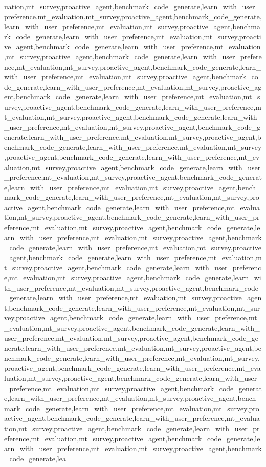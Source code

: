 uation,mt_survey,proactive_agent,benchmark_code_generate,learn_with_user_preference,mt_evaluation,mt_survey,proactive_agent,benchmark_code_generate,learn_with_user_preference,mt_evaluation,mt_survey,proactive_agent,benchmark_code_generate,learn_with_user_preference,mt_evaluation,mt_survey,proactive_agent,benchmark_code_generate,learn_with_user_preference,mt_evaluation,mt_survey,proactive_agent,benchmark_code_generate,learn_with_user_preference,mt_evaluation,mt_survey,proactive_agent,benchmark_code_generate,learn_with_user_preference,mt_evaluation,mt_survey,proactive_agent,benchmark_code_generate,learn_with_user_preference,mt_evaluation,mt_survey,proactive_agent,benchmark_code_generate,learn_with_user_preference,mt_evaluation,mt_survey,proactive_agent,benchmark_code_generate,learn_with_user_preference,mt_evaluation,mt_survey,proactive_agent,benchmark_code_generate,learn_with_user_preference,mt_evaluation,mt_survey,proactive_agent,benchmark_code_generate,learn_with_user_preference,mt_evaluation,mt_survey,proactive_agent,benchmark_code_generate,learn_with_user_preference,mt_evaluation,mt_survey,proactive_agent,benchmark_code_generate,learn_with_user_preference,mt_evaluation,mt_survey,proactive_agent,benchmark_code_generate,learn_with_user_preference,mt_evaluation,mt_survey,proactive_agent,benchmark_code_generate,learn_with_user_preference,mt_evaluation,mt_survey,proactive_agent,benchmark_code_generate,learn_with_user_preference,mt_evaluation,mt_survey,proactive_agent,benchmark_code_generate,learn_with_user_preference,mt_evaluation,mt_survey,proactive_agent,benchmark_code_generate,learn_with_user_preference,mt_evaluation,mt_survey,proactive_agent,benchmark_code_generate,learn_with_user_preference,mt_evaluation,mt_survey,proactive_agent,benchmark_code_generate,learn_with_user_preference,mt_evaluation,mt_survey,proactive_agent,benchmark_code_generate,learn_with_user_preference,mt_evaluation,mt_survey,proactive_agent,benchmark_code_generate,learn_with_user_preference,mt_evaluation,mt_survey,proactive_agent,benchmark_code_generate,learn_with_user_preference,mt_evaluation,mt_survey,proactive_agent,benchmark_code_generate,learn_with_user_preference,mt_evaluation,mt_survey,proactive_agent,benchmark_code_generate,learn_with_user_preference,mt_evaluation,mt_survey,proactive_agent,benchmark_code_generate,learn_with_user_preference,mt_evaluation,mt_survey,proactive_agent,benchmark_code_generate,learn_with_user_preference,mt_evaluation,mt_survey,proactive_agent,benchmark_code_generate,learn_with_user_preference,mt_evaluation,mt_survey,proactive_agent,benchmark_code_generate,learn_with_user_preference,mt_evaluation,mt_survey,proactive_agent,benchmark_code_generate,learn_with_user_preference,mt_evaluation,mt_survey,proactive_agent,benchmark_code_generate,learn_with_user_preference,mt_evaluation,mt_survey,proactive_agent,benchmark_code_generate,learn_with_user_preference,mt_evaluation,mt_survey,proactive_agent,benchmark_code_generate,learn_with_user_preference,mt_evaluation,mt_survey,proactive_agent,benchmark_code_generate,learn_with_user_preference,mt_evaluation,mt_survey,proactive_agent,benchmark_code_generate,learn_with_user_preference,mt_evaluation,mt_survey,proactive_agent,benchmark_code_generate,learn_with_user_preference,mt_evaluation,mt_survey,proactive_agent,benchmark_code_generate,lea